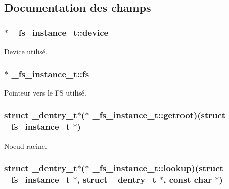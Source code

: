 \subsection{Documentation des champs}
\hypertarget{struct__fs__instance__t_acc3db122838752a84c6ecb93c3644256}{
\subsubsection[{device}]{$\ast$ \+\_\+fs\+\_\+instance\+\_\+t\+::device}}\label{struct__fs__instance__t_acc3db122838752a84c6ecb93c3644256}
Device utilisé. \hypertarget{struct__fs__instance__t_a209ef4e2ed00460eead263311373a974}{
\subsubsection[{fs}]{$\ast$ \+\_\+fs\+\_\+instance\+\_\+t\+::fs}}\label{struct__fs__instance__t_a209ef4e2ed00460eead263311373a974}
Pointeur vers le F\+S utilisé. \hypertarget{struct__fs__instance__t_af6891a9d9e5c2fd0458312fd8567213a}{
\subsubsection[{getroot}]{\setlength{\rightskip}{0pt plus 5cm}struct {\bf \+\_\+dentry\+\_\+t}$\ast$($\ast$ \+\_\+fs\+\_\+instance\+\_\+t\+::getroot)(struct {\bf \+\_\+fs\+\_\+instance\+\_\+t} $\ast$)}}\label{struct__fs__instance__t_af6891a9d9e5c2fd0458312fd8567213a}
Noeud racine. \hypertarget{struct__fs__instance__t_a820510562ecb31cbbf6b4fc8a4d2ce6a}{
\subsubsection[{lookup}]{\setlength{\rightskip}{0pt plus 5cm}struct {\bf \+\_\+dentry\+\_\+t}$\ast$($\ast$ \+\_\+fs\+\_\+instance\+\_\+t\+::lookup)(struct {\bf \+\_\+fs\+\_\+instance\+\_\+t} $\ast$, struct {\bf \+\_\+dentry\+\_\+t} $\ast$, const char $\ast$)}}\label{struct__fs__instance__t_a820510562ecb31cbbf6b4fc8a4d2ce6a}

